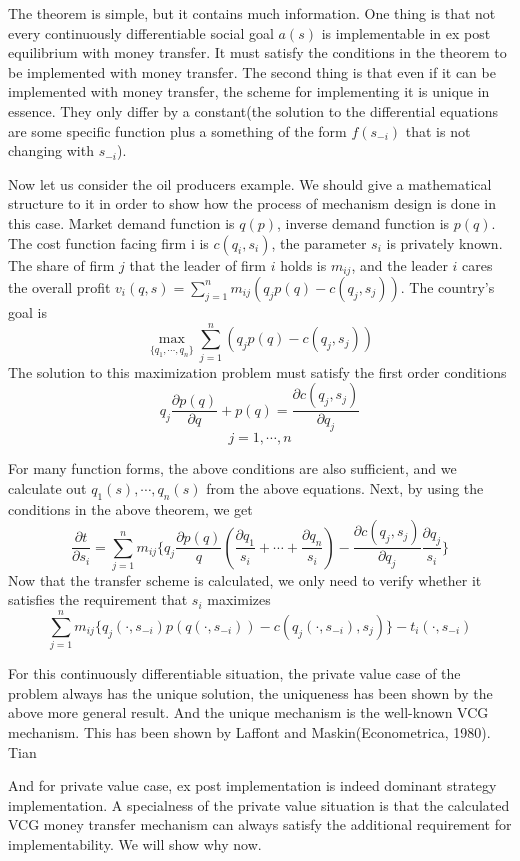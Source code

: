 The theorem is simple, but it contains much information. One thing is that not every continuously differentiable
social goal $a(s)$ is implementable in ex post equilibrium with money transfer. It must satisfy the conditions in the theorem 
to be implemented with money transfer. The second thing is that even if it can be implemented with money transfer, the scheme for 
implementing it is unique in essence. They only differ by a constant(the solution to the differential equations are some specific
function plus a something of the form $f(s_{-i})$ that is not changing with $s_{-i}$).

Now let us consider the oil producers example. We should give a mathematical structure to it in order to show how the process of mechanism
design is done in this case. Market demand function is $q(p)$, inverse demand function is $p(q)$. The cost function 
facing firm i is $c(q_i,s_i)$, the parameter $s_i$ is privately known. The share of firm $j$
that the leader of firm  $i$ holds is $m_{ij}$, and  the leader $i$ cares the overall profit 
$v_i(q,s)=\sum_{j=1}^{n} m_{ij}(q_jp(q)-c(q_j,s_j))$. The country's goal is 
$$\max_{\{q_1,\cdots,q_n\}}\sum_{j=1}^{n} (q_jp(q)-c(q_j,s_j)) $$
The solution to this maximization problem must satisfy the first order conditions
$$q_j \frac {\partial p(q)}{\partial q}+p(q)=\frac {\partial c(q_j,s_j)}{\partial q_j}$$
$$j=1,\cdots,n$$

For many function forms, the above conditions are also sufficient, and we calculate out ${q_1(s),\cdots,q_n(s)}$ from the above 
equations. Next, by using the conditions in the above theorem, we get 
$$\frac{\partial t}{\partial s_i} = \sum_{j=1}^{n} m_{ij}\{q_j\frac {\partial p(q)}{q}(\frac{\partial q_1}{s_i}+\cdots+\frac{\partial q_n}{s_i})-\frac {\partial c(q_j,s_j)}{\partial q_j}\frac{\partial q_j}{s_i}\}$$
Now that the transfer scheme is calculated, we only need to verify whether it satisfies the requirement that $s_i$ maximizes  
$$\sum_{j=1}^{n} m_{ij}\{q_j(\cdot,s_{-i})p(q(\cdot,s_{-i}))-c(q_j(\cdot,s_{-i}),s_j)\}-t_i(\cdot,s_{-i})$$

For this continuously differentiable situation, the private value case of the problem always has the unique solution, the uniqueness
has been shown by the above more general result. And the unique mechanism is the well-known VCG mechanism. This has been shown by
Laffont and Maskin(Econometrica, 1980). Tian

And for private value case, 
ex post implementation is indeed dominant strategy implementation. A specialness of the private value situation is that the calculated
VCG money transfer mechanism can always satisfy the additional requirement for implementability. We will show why now. 
